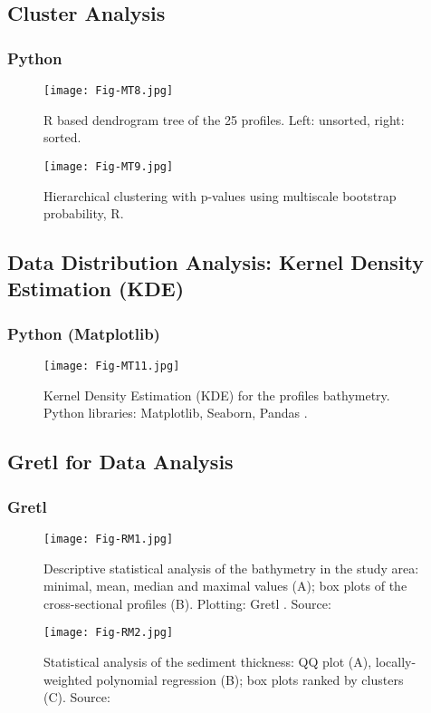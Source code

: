 \documentclass[pdflatex,compress,8pt,
	xcolor={dvipsnames,dvipsnames,svgnames,x11names,table},
	hyperref={colorlinks = true,breaklinks = true, urlcolor = NavyBlue, breaklinks = true}]{beamer}
\begin{document}
\subsection{Cluster Analysis}

\begin{frame}\frametitle{Python}
\begin{figure}[H]
		\texttt{[image: Fig-MT8.jpg]}
	\caption{R based dendrogram tree of the 25 profiles. Left: unsorted, right: sorted. \cite{Lemenkova201868}}\label{fig:MT8}
\end{figure}

\begin{figure}[H]
	\centering
		\texttt{[image: Fig-MT9.jpg]}
	\caption{Hierarchical clustering with p-values using multiscale bootstrap probability, R. \cite{Lemenkova201868}}\label{fig:MT9}
\end{figure}
\end{frame}

\subsection{Data Distribution Analysis: Kernel Density Estimation (KDE)}
\begin{frame}\frametitle{Python (Matplotlib)}
\begin{figure}[H]
	\centering
		\texttt{[image: Fig-MT11.jpg]}
	\caption{Kernel Density Estimation (KDE) for the profiles bathymetry. \\
	Python libraries: Matplotlib, Seaborn, Pandas \cite{Rossumatal2018}. \cite{Lemenkova201905}}\label{fig:MT11}
\end{figure}
\end{frame}

\subsection{Gretl for Data Analysis}

\begin{frame}\frametitle{Gretl}
\begin{figure}[H]
		\texttt{[image: Fig-RM1.jpg]}
	\caption{Descriptive statistical analysis of the bathymetry in the study area: minimal, mean, median and maximal values (A); box plots of the cross-sectional profiles (B). Plotting: Gretl
. Source: \cite{Lemenkova201988}}\label{fig:RM1}
\end{figure}

\begin{figure}[H]
	\centering
		\texttt{[image: Fig-RM2.jpg]}
	\caption{Statistical analysis of the sediment thickness: QQ plot (A), locally-weighted polynomial regression (B); box plots ranked by clusters (C). Source: \cite{Lemenkova201988}}\label{fig:RM2}
\end{figure}
\end{frame}
\end{document}
